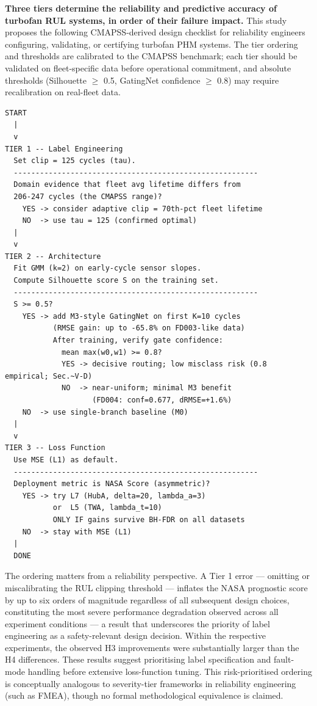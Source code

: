 \documentclass[review,12pt]{elsarticle}
\begin{document}
\textbf{Three tiers determine the reliability and predictive accuracy of turbofan RUL systems, in order of their failure impact.} This study proposes the following CMAPSS-derived design checklist for reliability engineers configuring, validating, or certifying turbofan PHM systems. The tier ordering and thresholds are calibrated to the CMAPSS benchmark; each tier should be validated on fleet-specific data before operational commitment, and absolute thresholds (Silhouette $\geq$ 0.5, GatingNet confidence $\geq$ 0.8) may require recalibration on real-fleet data.
{\small\begin{verbatim}
START
  |
  v
TIER 1 -- Label Engineering
  Set clip = 125 cycles (tau).
  --------------------------------------------------------
  Domain evidence that fleet avg lifetime differs from
  206-247 cycles (the CMAPSS range)?
    YES -> consider adaptive clip = 70th-pct fleet lifetime
    NO  -> use tau = 125 (confirmed optimal)
  |
  v
TIER 2 -- Architecture
  Fit GMM (k=2) on early-cycle sensor slopes.
  Compute Silhouette score S on the training set.
  --------------------------------------------------------
  S >= 0.5?
    YES -> add M3-style GatingNet on first K=10 cycles
           (RMSE gain: up to -65.8% on FD003-like data)
           After training, verify gate confidence:
             mean max(w0,w1) >= 0.8?
             YES -> decisive routing; low misclass risk (0.8 empirical; Sec.~V-D)
             NO  -> near-uniform; minimal M3 benefit
                    (FD004: conf=0.677, dRMSE=+1.6%)
    NO  -> use single-branch baseline (M0)
  |
  v
TIER 3 -- Loss Function
  Use MSE (L1) as default.
  --------------------------------------------------------
  Deployment metric is NASA Score (asymmetric)?
    YES -> try L7 (HubA, delta=20, lambda_a=3)
           or  L5 (TWA, lambda_t=10)
           ONLY IF gains survive BH-FDR on all datasets
    NO  -> stay with MSE (L1)
  |
  DONE
\end{verbatim}
}

The ordering matters from a reliability perspective. A Tier 1 error --- omitting or miscalibrating the RUL clipping threshold --- inflates the NASA prognostic score by up to six orders of magnitude regardless of all subsequent design choices, constituting the most severe performance degradation observed across all experiment conditions --- a result that underscores the priority of label engineering as a safety-relevant design decision. Within the respective experiments, the observed H3 improvements were substantially larger than the H4 differences. These results suggest prioritising label specification and fault-mode handling before extensive loss-function tuning. This risk-prioritised ordering is conceptually analogous to severity-tier frameworks in reliability engineering (such as FMEA), though no formal methodological equivalence is claimed.
\end{document}
